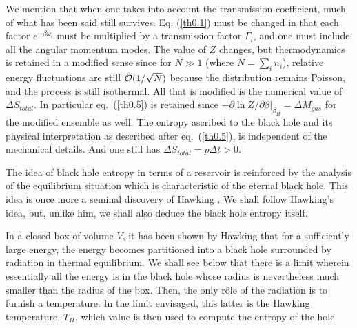 \documentclass[12pt,oneside]{report}
\begin{document}
We mention that when one takes into account the transmission
coefficient, much of what has been said still survives. Eq.
(\ref{th0.1}) must be changed in that each factor $ e^{-\beta
\omega_i}$  must be multiplied by a transmission factor $\Gamma_i$, and one must include
all the angular momentum modes.
The value of $Z$ changes, but thermodynamics is retained in a
modified sense since for $ N \gg  1$ (where $N= \sum_i n_i$), relative energy fluctuations
are still ${ \cal{O}} (1/ \sqrt N) $ because the distribution remains Poisson, 
and the process is still isothermal.
All that is modified is the numerical value of $\Delta S_{total}$. In
particular eq.~(\ref{th0.5}) is retained since $ -\partial \ln Z/
\partial \beta \vert_{\beta_H} = \Delta M_{gas}$ for the modified
ensemble as well. The entropy ascribed to the black hole and its
physical interpretation as described after eq.~(\ref{th0.5}), is
independent of the mechanical details. 
And one still has $\Delta S_{total} = p \Delta t >0$.

The idea of black hole entropy in terms of a reservoir is
reinforced by the analysis of the equilibrium situation which is
characteristic of the eternal black hole. This idea is once more
a seminal discovery of Hawking \cite{Hawk2}. We shall follow Hawking's idea,
but, unlike him, we shall also deduce the black hole entropy
itself.
 
In a closed box of volume $V$, it has been shown by Hawking
that for a sufficiently large energy, the energy becomes partitioned into 
a black hole surrounded by radiation in thermal equilibrium. We 
shall see below that there is a limit wherein 
essentially all the energy is in the black hole
whose radius is nevertheless 
much smaller than the radius of the box. Then, the only
r\^ole of the radiation is to furnish a temperature.
 In the limit envisaged, this latter is the Hawking temperature, $T_H$,
which value is then used to compute the entropy of the hole.
\end{document}
